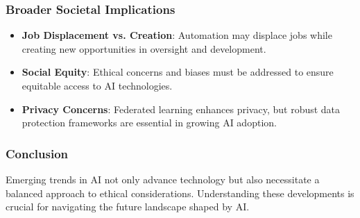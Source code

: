 \documentclass{beamer}
\begin{document}
\begin{frame}[fragile]
    \frametitle{Broader Societal Implications}
    \begin{itemize}
        \item \textbf{Job Displacement vs. Creation}: Automation may displace jobs while creating new opportunities in oversight and development.
        \item \textbf{Social Equity}: Ethical concerns and biases must be addressed to ensure equitable access to AI technologies.
        \item \textbf{Privacy Concerns}: Federated learning enhances privacy, but robust data protection frameworks are essential in growing AI adoption.
    \end{itemize}
\end{frame}

\begin{frame}[fragile]
    \frametitle{Conclusion}
    Emerging trends in AI not only advance technology but also necessitate a balanced approach to ethical considerations. Understanding these developments is crucial for navigating the future landscape shaped by AI.
\end{frame}
\end{document}
